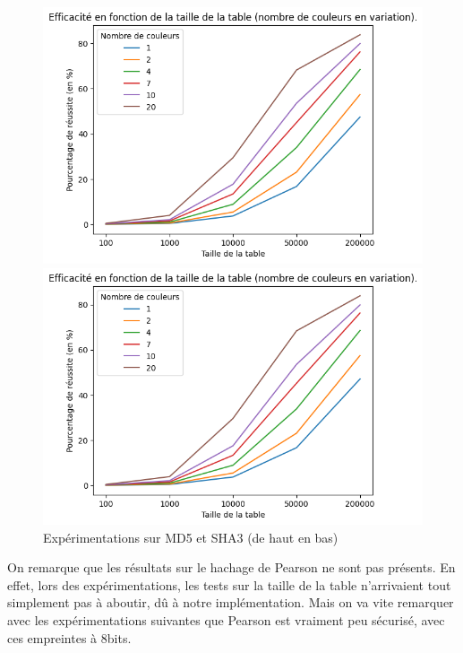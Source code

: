 \documentclass[french,12pt]{article}
\begin{document}
    \begin{figure}[H]
                
    
      \includegraphics[scale=0.9]{img/graphe/md5/T_C_S_137092_MotGenerator.png}
   
    
      \includegraphics[scale=0.9]{img/graphe/sha3/T_C_S_137092_MotGenerator.png}
   
    \hspace{0mm}
    
    \caption{Expérimentations sur MD5 et SHA3 (de haut en bas)}
    \label{fig:TCS}
    \end{figure}

    On remarque que les résultats sur le hachage de Pearson ne sont pas présents. En effet, lors des expérimentations, les tests sur la taille de la table n'arrivaient tout simplement pas à aboutir, dû à notre implémentation. Mais on va vite remarquer avec les expérimentations suivantes que Pearson est vraiment peu sécurisé, avec ces empreintes à 8bits.
\end{document}
